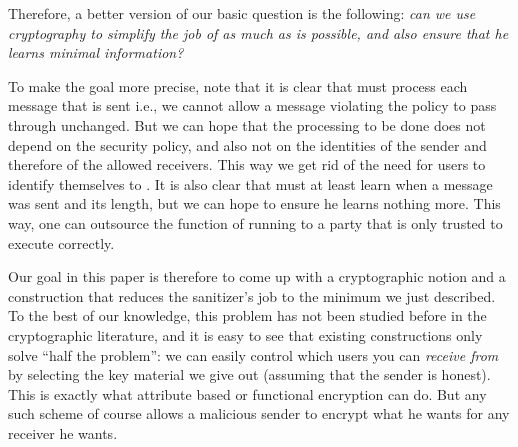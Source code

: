 \documentclass{llncs}
\begin{document}
Therefore, a better version of our basic question is the following: \emph{can we use cryptography to simplify
the job of  as much as is possible, and also ensure that he learns minimal information?} 

To make the goal more precise, note that it is clear that  must process each message that is sent
i.e., we cannot allow a message violating the policy to pass through unchanged. But we can hope that the processing to be done does not depend on the security policy, and also not on the identities of the sender and therefore of the allowed receivers. This way we get rid of the need for users to identify themselves to . It is also clear that  must at least learn when a message was sent and its length, but we can hope to ensure he learns nothing more. This way, one can outsource the function of running  to a party that is only trusted to execute correctly.

Our goal in this paper is therefore to come up with a cryptographic notion and a construction that  reduces the sanitizer's job to the minimum we just described.
To the best of our knowledge, this problem has not been studied before in the cryptographic literature, and it is easy to see that existing constructions only solve ``half the problem'': we can easily control which users you can \emph{receive from} by selecting the key material we give out (assuming that the sender is honest). This is exactly what attribute based \cite{DBLP:conf/ccs/GoyalPSW06} or functional encryption \cite{DBLP:conf/tcc/BonehSW11} can do. But any such scheme of course allows a malicious sender to encrypt what he wants for any receiver he wants.
\end{document}
